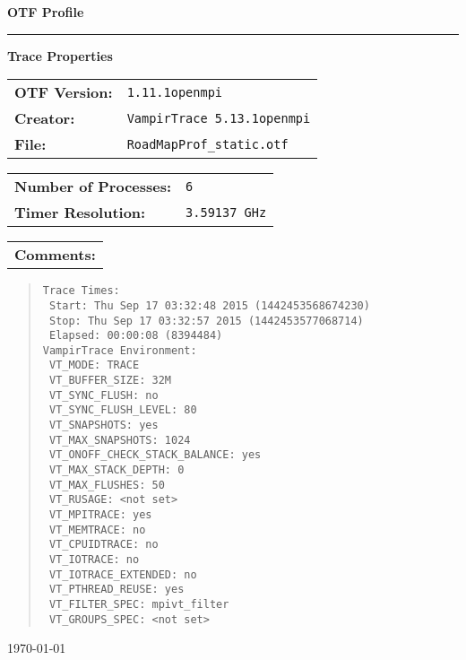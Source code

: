 \documentclass[a4paper,10pt]{article}
\begin{document}
\begin{titlepage}\thispagestyle{empty}
\begin{huge}\begin{flushleft}\bf{OTF Profile}\end{flushleft}\end{huge}
\hrule
\begin{flushright}\textbf{\large Trace Properties}\end{flushright}
\vspace{0.5\baselineskip}
\begin{flushleft}
\begin{tabular}{ll}
\bf{OTF Version:} & \verb|1.11.1openmpi| \\
\bf{Creator:} & \verb|VampirTrace 5.13.1openmpi|\\
\bf{File:} & \verb|RoadMapProf_static.otf|
\end{tabular}

\vspace{1\baselineskip}
\begin{tabular}{ll}
\bf{Number of Processes:} & \verb|6|\\
\bf{Timer Resolution:} & \verb|3.59137 GHz|
\end{tabular}

\vspace{1\baselineskip}
\begin{tabular}{l}\bf{Comments:}\end{tabular}
\begin{quote}\begin{verbatim}
Trace Times:
 Start: Thu Sep 17 03:32:48 2015 (1442453568674230)
 Stop: Thu Sep 17 03:32:57 2015 (1442453577068714)
 Elapsed: 00:00:08 (8394484)
VampirTrace Environment:
 VT_MODE: TRACE
 VT_BUFFER_SIZE: 32M
 VT_SYNC_FLUSH: no
 VT_SYNC_FLUSH_LEVEL: 80
 VT_SNAPSHOTS: yes
 VT_MAX_SNAPSHOTS: 1024
 VT_ONOFF_CHECK_STACK_BALANCE: yes
 VT_MAX_STACK_DEPTH: 0
 VT_MAX_FLUSHES: 50
 VT_RUSAGE: <not set>
 VT_MPITRACE: yes
 VT_MEMTRACE: no
 VT_CPUIDTRACE: no
 VT_IOTRACE: no
 VT_IOTRACE_EXTENDED: no
 VT_PTHREAD_REUSE: yes
 VT_FILTER_SPEC: mpivt_filter
 VT_GROUPS_SPEC: <not set>
\end{verbatim}\end{quote}
\end{flushleft}
\vspace*{\fill}
\begin{flushright}\today\end{flushright}
\end{titlepage}
\end{document}
